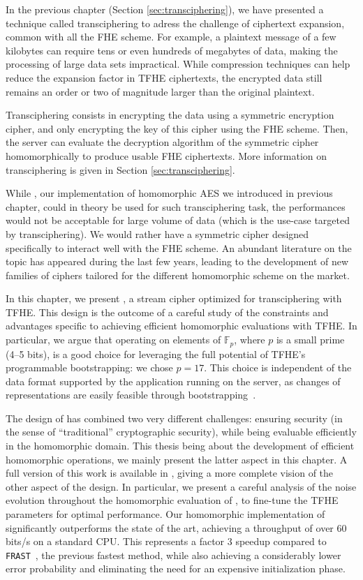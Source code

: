 In the previous chapter (Section \ref{sec:transciphering}), we have presented a technique called transciphering to adress the challenge of ciphertext expansion, common with all the FHE scheme. For example, a plaintext message of a few kilobytes can require tens or even hundreds of megabytes of data, making the processing of large data sets impractical. While compression techniques can help reduce the expansion factor in TFHE ciphertexts, the encrypted data still remains an order or two of magnitude larger than the original plaintext.


Transciphering consists in encrypting the data using a symmetric encryption cipher, and only encrypting the key of this cipher using the FHE scheme. Then, the server can evaluate the decryption algorithm of the symmetric cipher homomorphically to produce usable FHE ciphertexts. More information on transciphering is given in Section \ref{sec:transciphering}.


While \hippo, our implementation of homomorphic AES we introduced in previous chapter, could in theory be used for such transciphering task, the performances would not be acceptable for large volume of data (which is the use-case targeted by transciphering). We would rather have a symmetric cipher designed specifically to interact well with the FHE scheme. An abundant literature on the topic has appeared during the last few years, leading to the development of new families of ciphers tailored for the different homomorphic scheme on the market.


In this chapter, we present \coolName{}, a stream cipher optimized for transciphering with TFHE. This design is the outcome of a careful study of the constraints and advantages specific to achieving efficient homomorphic evaluations with TFHE. In particular, we argue that operating on elements of $\mathbb{F}_p$, where $p$ is a small prime (4--5 bits), is a good choice for leveraging the full potential of TFHE’s programmable bootstrapping: we chose $p=17$. This choice is independent of the data format supported by the application running on the server, as changes of representations are easily feasible through bootstrapping~\cite{JC:BBBCLO23}.


The design of \coolName has combined two very different challenges: ensuring security (in the sense of ``traditional'' cryptographic security), while being evaluable efficiently in the homomorphic domain. This thesis being about the development of efficient homomorphic operations, we mainly present the latter aspect in this chapter. A full version of this work is available in \cite{EPRINT:BBBBCL25}, giving a more complete vision of the other aspect of the design. In particular, we present a careful analysis of the noise evolution throughout  the homomorphic evaluation of \coolName, to fine-tune the TFHE parameters for optimal performance. Our homomorphic implementation of \coolName{} significantly outperforms the state of the art, achieving a throughput of over 60 bits/s on a standard CPU. This represents a factor 3 speedup compared to \texttt{FRAST}~\cite{ToSC:CCHLOS24}, the previous fastest method, while also achieving a considerably lower error probability and eliminating the need for an expensive initialization phase.


